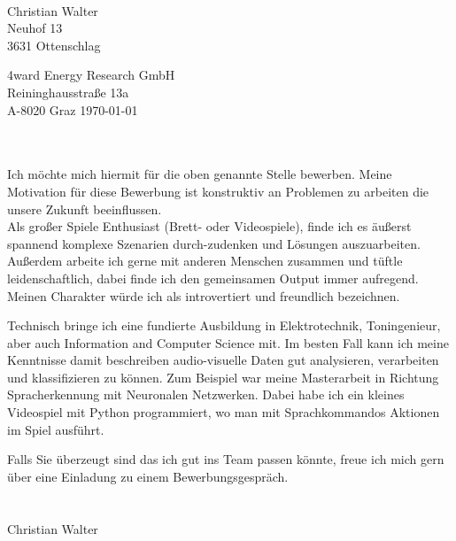 \documentclass[11pt, a4paper]{article}
\begin{document}
\vspace*{1cm}
\begin{center}
  \\
\end{center}

\vspace{1cm}
Christian Walter\\
Neuhof 13\\
3631 Ottenschlag\\
\vspace{1cm}

4ward Energy Research GmbH\\
Reininghausstraße 13a\\
A-8020 Graz
\hfill
\today\\
\vspace{1cm}

\\\\
Ich möchte mich hiermit für die oben genannte Stelle bewerben.
Meine Motivation für diese Bewerbung ist konstruktiv an Problemen zu arbeiten die unsere Zukunft beeinflussen.\\
Als großer Spiele Enthusiast (Brett- oder Videospiele), finde ich es äußerst spannend komplexe Szenarien durch-zudenken und Lösungen auszuarbeiten.
Außerdem arbeite ich gerne mit anderen Menschen zusammen und tüftle leidenschaftlich, dabei finde ich den gemeinsamen Output immer aufregend.\\
Meinen Charakter würde ich als introvertiert und freundlich bezeichnen.

Technisch bringe ich eine fundierte Ausbildung in Elektrotechnik, Toningenieur, aber auch Information and Computer Science mit. Im besten Fall kann ich meine Kenntnisse damit beschreiben audio-visuelle Daten gut analysieren, verarbeiten und klassifizieren zu können.
Zum Beispiel war meine Masterarbeit in Richtung Spracherkennung mit Neuronalen Netzwerken. Dabei habe ich ein kleines Videospiel mit Python programmiert, wo man mit Sprachkommandos Aktionen im Spiel ausführt.

Falls Sie überzeugt sind das ich gut ins Team passen könnte, freue ich mich gern über eine Einladung zu einem Bewerbungsgespräch.\\

\\\\ Christian Walter
\end{document}
